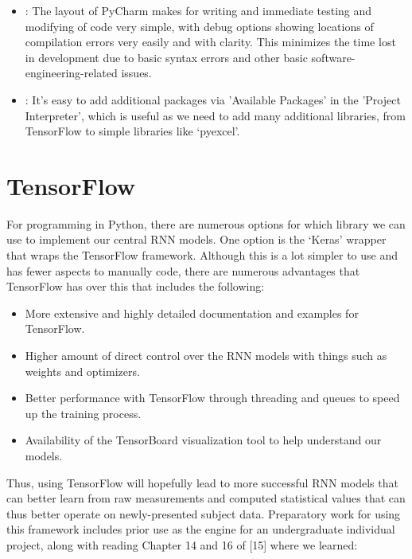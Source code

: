 \documentclass[12pt,twoside]{report}
\begin{document}
\begin{itemize}
	\item \underline{}: The layout of PyCharm makes for writing and immediate testing and modifying of code very simple, with debug options showing locations of compilation errors very easily and with clarity. This minimizes the time lost in development due to basic syntax errors and other basic software-engineering-related issues.
	\item \underline{}: It’s easy to add additional packages via 'Available Packages' in the 'Project Interpreter', which is useful as we need to add many additional libraries, from TensorFlow to simple libraries like ‘pyexcel’.
\end{itemize}


\section{TensorFlow}

\quad For programming in Python, there are numerous options for which library we can use to implement our central RNN models. One option is the ‘Keras’ wrapper that wraps the TensorFlow framework. Although this is a lot simpler to use and has fewer aspects to manually code, there are numerous advantages that TensorFlow has over this that includes the following:

\begin{itemize}
	\item More extensive and highly detailed documentation and examples for TensorFlow.
	\item Higher amount of direct control over the RNN models with things such as weights and optimizers.
	\item Better performance with TensorFlow through threading and queues to speed up the training process.
	\item Availability of the TensorBoard visualization tool to help understand our models.
\end{itemize}

\quad Thus, using TensorFlow will hopefully lead to more successful RNN models that can better learn from raw measurements and computed statistical values that can thus better operate on newly-presented subject data. Preparatory work for using this framework includes prior use as the engine for an undergraduate individual project, along with reading Chapter 14 and 16 of [15] where we learned:
\end{document}
